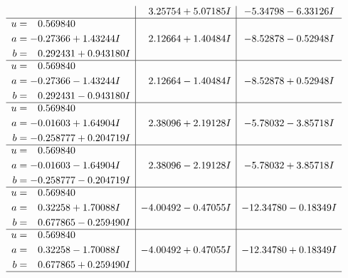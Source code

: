 \documentclass[1p]{elsarticle_modified}
\theoremstyle{definition}
\begin{document}
$$\begin{array}{c|c|c}
 & \phantom{-}3.25754 + 5.07185 I & -5.34798 - 6.33126 I \\ \hline\begin{aligned}
u &= \phantom{-}0.569840\phantom{ +0.000000I} \\
a &= -0.27366 + 1.43244 I \\
b &= \phantom{-}0.292431 + 0.943180 I\end{aligned}
 & \phantom{-}2.12664 + 1.40484 I & -8.52878 - 0.52948 I \\ \hline\begin{aligned}
u &= \phantom{-}0.569840\phantom{ +0.000000I} \\
a &= -0.27366 - 1.43244 I \\
b &= \phantom{-}0.292431 - 0.943180 I\end{aligned}
 & \phantom{-}2.12664 - 1.40484 I & -8.52878 + 0.52948 I \\ \hline\begin{aligned}
u &= \phantom{-}0.569840\phantom{ +0.000000I} \\
a &= -0.01603 + 1.64904 I \\
b &= -0.258777 + 0.204719 I\end{aligned}
 & \phantom{-}2.38096 + 2.19128 I & -5.78032 - 3.85718 I \\ \hline\begin{aligned}
u &= \phantom{-}0.569840\phantom{ +0.000000I} \\
a &= -0.01603 - 1.64904 I \\
b &= -0.258777 - 0.204719 I\end{aligned}
 & \phantom{-}2.38096 - 2.19128 I & -5.78032 + 3.85718 I \\ \hline\begin{aligned}
u &= \phantom{-}0.569840\phantom{ +0.000000I} \\
a &= \phantom{-}0.32258 + 1.70088 I \\
b &= \phantom{-}0.677865 - 0.259490 I\end{aligned}
 & -4.00492 - 0.47055 I & -12.34780 - 0.18349 I \\ \hline\begin{aligned}
u &= \phantom{-}0.569840\phantom{ +0.000000I} \\
a &= \phantom{-}0.32258 - 1.70088 I \\
b &= \phantom{-}0.677865 + 0.259490 I\end{aligned}
 & -4.00492 + 0.47055 I & -12.34780 + 0.18349 I\\
 \hline 
 \end{array}$$\newpage$$\begin{array}{c|c|c}  

\end{array}$$
\end{document}
